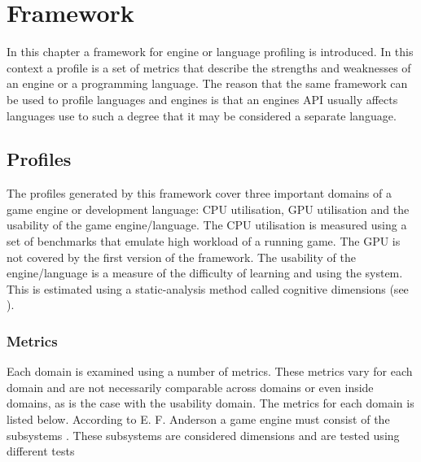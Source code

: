 \chapter{Framework}
In this chapter a framework for engine or language profiling is introduced. In this context a profile is a set of metrics that describe the strengths and weaknesses of an engine or a programming language. The reason that the same framework can be used to profile languages and engines is that an engines \ac{API} usually affects languages use to such a degree that it may be considered a separate language.

\section{Profiles}
The profiles generated by this framework cover three important domains of a game engine or development language: \ac{CPU} utilisation, \ac{GPU} utilisation and the usability of the game engine/language. The \ac{CPU} utilisation is measured using a set of benchmarks that emulate high workload of a running game. The \ac{GPU} is not covered by the first version of the framework. The usability of the engine/language is a measure of the difficulty of learning and using the system. This is estimated using a static-analysis method called cognitive dimensions (see ).

\subsection{Metrics}
Each domain is examined using a number of metrics. These metrics vary for each domain and are not necessarily comparable across domains or even inside domains, as is the case with the usability domain. The metrics for each domain is listed below. According to E. F. Anderson \cite{5962102} a game engine must consist of the subsystems . These subsystems are considered dimensions and are tested using different tests

